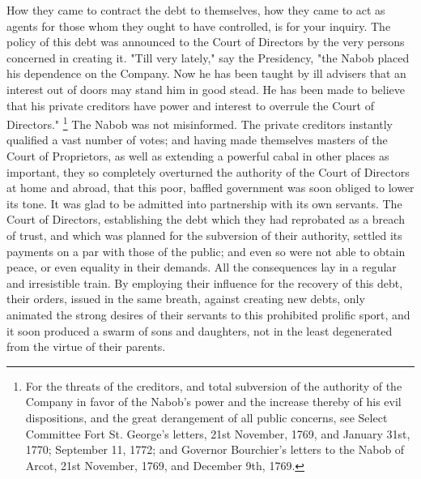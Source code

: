How they came to contract the debt to themselves, how they came to act as agents for those whom they ought to have controlled, is for your inquiry. The policy of this debt was announced to the Court of Directors by the very persons concerned in creating it. "Till very lately," say the Presidency, "the Nabob placed his dependence on the Company. Now he has been taught by ill advisers that an interest out of doors may stand him in good stead. He has been made to believe that his private creditors have power and interest to overrule the Court of Directors."
\footnote{ For the threats of the creditors, and total subversion of the authority of the Company in favor of the Nabob's power and the increase thereby of his evil dispositions, and the great derangement of all public concerns, see Select Committee Fort St. George's letters, 21st November, 1769, and January 31st, 1770; September 11, 1772; and Governor Bourchier's letters to the Nabob of Arcot, 21st November, 1769, and December 9th, 1769.}
 The Nabob was not misinformed. The private creditors instantly qualified a vast number of votes; and having made themselves masters of the Court of Proprietors, as well as extending a powerful cabal in other places as important, they so completely overturned the authority of the Court of Directors at home and abroad, that this poor, baffled government was soon obliged to lower its tone. It was glad to be admitted into partnership with its own servants. The Court of Directors, establishing the debt which they had reprobated as a breach of trust, and which was planned for the subversion of their authority, settled its payments on a par with those of the public; and even so were not able to obtain peace, or even equality in their demands. All the consequences lay in a regular and irresistible train. By employing their influence for the recovery of this debt, their orders, issued in the same breath, against creating new debts, only animated the strong desires of their servants to this prohibited prolific sport, and it soon produced a swarm of sons and daughters, not in the least degenerated from the virtue of their parents.

